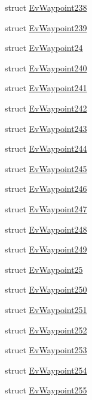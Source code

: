 \begin{DoxyCompactItemize}
\item 
struct \hyperlink{structmove__base__z__client_1_1EvWaypoint238}{Ev\+Waypoint238}
\item 
struct \hyperlink{structmove__base__z__client_1_1EvWaypoint239}{Ev\+Waypoint239}
\item 
struct \hyperlink{structmove__base__z__client_1_1EvWaypoint24}{Ev\+Waypoint24}
\item 
struct \hyperlink{structmove__base__z__client_1_1EvWaypoint240}{Ev\+Waypoint240}
\item 
struct \hyperlink{structmove__base__z__client_1_1EvWaypoint241}{Ev\+Waypoint241}
\item 
struct \hyperlink{structmove__base__z__client_1_1EvWaypoint242}{Ev\+Waypoint242}
\item 
struct \hyperlink{structmove__base__z__client_1_1EvWaypoint243}{Ev\+Waypoint243}
\item 
struct \hyperlink{structmove__base__z__client_1_1EvWaypoint244}{Ev\+Waypoint244}
\item 
struct \hyperlink{structmove__base__z__client_1_1EvWaypoint245}{Ev\+Waypoint245}
\item 
struct \hyperlink{structmove__base__z__client_1_1EvWaypoint246}{Ev\+Waypoint246}
\item 
struct \hyperlink{structmove__base__z__client_1_1EvWaypoint247}{Ev\+Waypoint247}
\item 
struct \hyperlink{structmove__base__z__client_1_1EvWaypoint248}{Ev\+Waypoint248}
\item 
struct \hyperlink{structmove__base__z__client_1_1EvWaypoint249}{Ev\+Waypoint249}
\item 
struct \hyperlink{structmove__base__z__client_1_1EvWaypoint25}{Ev\+Waypoint25}
\item 
struct \hyperlink{structmove__base__z__client_1_1EvWaypoint250}{Ev\+Waypoint250}
\item 
struct \hyperlink{structmove__base__z__client_1_1EvWaypoint251}{Ev\+Waypoint251}
\item 
struct \hyperlink{structmove__base__z__client_1_1EvWaypoint252}{Ev\+Waypoint252}
\item 
struct \hyperlink{structmove__base__z__client_1_1EvWaypoint253}{Ev\+Waypoint253}
\item 
struct \hyperlink{structmove__base__z__client_1_1EvWaypoint254}{Ev\+Waypoint254}
\item 
struct \hyperlink{structmove__base__z__client_1_1EvWaypoint255}{Ev\+Waypoint255}
\item 

\end{DoxyCompactItemize}

